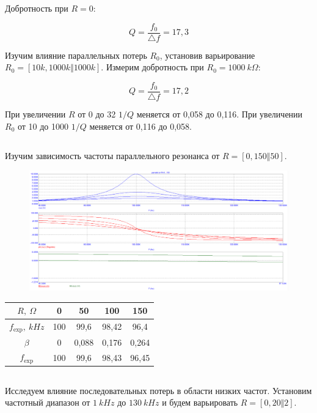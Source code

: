 \documentclass{article}
\begin{document}
Добротность при $R = 0$:

\[Q = \frac{f_0}{\triangle f} = 17,3\]

Изучим влияние параллельных потерь $R_0$, установив варьирование $R_0 = [10k, 1000k \Vert 1000k]$. Измерим добротность при $R_0 = 1000 \: k\Omega$:

\[Q = \frac{f_0}{\triangle f} = 17,2\]

При увеличении $R$ от 0 \Omega до 32 \Omega $1/Q$ меняется от 0,058 до 0,116. При увеличении $R_0$ от 10 \Omega до 1000 \Omega $1/Q$ меняется от 0,116 до 0,058.

\subsection{}
Изучим зависимость частоты параллельного резонанса от $R = [0, 150 \Vert 50]$.

\begin{figure}[H]
\centering
\includegraphics[scale=0.4]{parallel_AC2.png}
\label{fig:Image1}
\end{figure} 

\begin{center}
\begin{tabular}{|c|c|c|c|c|}
\hline 
$R, \: \Omega$ & 0 & 50 & 100 & 150 \\ 
\hline 
$f_{\exp}, \: kHz$ & 100 & 99,6 & 98,42 & 96,4 \\ 
\hline 
$\beta$ & 0 & 0,088 & 0,176 & 0,264 \\ 
\hline 
$f_{\exp}$ & 100 & 99,6 & 98,43 & 96,45 \\ 
\hline 
\end{tabular} 
\end{center}

\subsection{}
Исследуем влияние последовательных потерь в области низких частот. Установим частотный диапазон от $1 \: kHz$ до $130 \: kHz$ и будем варьировать $R = [0,20 \Vert 2]$.
\end{document}
